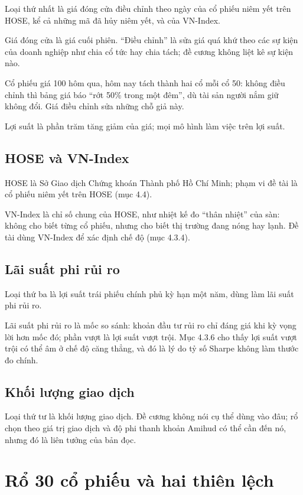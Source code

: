 Loại thứ nhất là giá đóng cửa điều chỉnh theo ngày của cổ phiếu niêm yết trên HOSE, kể cả những mã đã hủy niêm yết, và của VN-Index.

Giá đóng cửa là giá cuối phiên. “Điều chỉnh” là sửa giá quá khứ theo các sự kiện của doanh nghiệp như chia cổ tức hay chia tách; đề cương không liệt kê sự kiện nào.

Cổ phiếu giá 100 hôm qua, hôm nay tách thành hai cổ mỗi cổ 50: không điều chỉnh thì bảng giá báo “rớt 50\% trong một đêm”, dù tài sản người nắm giữ không đổi. Giá điều chỉnh sửa những chỗ giả này.

Lợi suất là phần trăm tăng giảm của giá; mọi mô hình làm việc trên lợi suất.

\subsection{HOSE và VN-Index}

HOSE là Sở Giao dịch Chứng khoán Thành phố Hồ Chí Minh; phạm vi đề tài là cổ phiếu niêm yết trên HOSE (mục 4.4).

VN-Index là chỉ số chung của HOSE, như nhiệt kế đo “thân nhiệt” của sàn: không cho biết từng cổ phiếu, nhưng cho biết thị trường đang nóng hay lạnh. Đề tài dùng VN-Index để xác định chế độ (mục 4.3.4).

\subsection{Lãi suất phi rủi ro}

Loại thứ ba là lợi suất trái phiếu chính phủ kỳ hạn một năm, dùng làm lãi suất phi rủi ro.

Lãi suất phi rủi ro là mốc so sánh: khoản đầu tư rủi ro chỉ đáng giá khi kỳ vọng lời hơn mốc đó; phần vượt là lợi suất vượt trội. Mục 4.3.6 cho thấy lợi suất vượt trội có thể âm ở chế độ căng thẳng, và đó là lý do tỷ số Sharpe không làm thước đo chính.

\subsection{Khối lượng giao dịch}

Loại thứ tư là khối lượng giao dịch. Đề cương không nói cụ thể dùng vào đâu; rổ chọn theo giá trị giao dịch và độ phi thanh khoản Amihud có thể cần đến nó, nhưng đó là liên tưởng của bản đọc.

\section{Rổ 30 cổ phiếu và hai thiên lệch}

